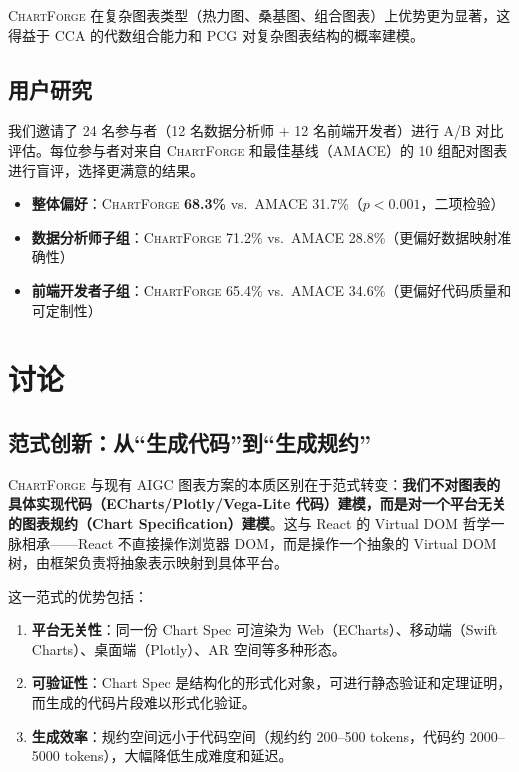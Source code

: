 \documentclass[12pt,a4paper]{ctexart}
\theoremstyle{remark}
\newcommand{\ChartForge}{\textsc{ChartForge}}
\begin{document}
\ChartForge{} 在复杂图表类型（热力图、桑基图、组合图表）上优势更为显著，这得益于 CCA 的代数组合能力和 PCG 对复杂图表结构的概率建模。

\subsection{用户研究}

我们邀请了 24 名参与者（12 名数据分析师 $+$ 12 名前端开发者）进行 A/B 对比评估。每位参与者对来自 \ChartForge{} 和最佳基线（AMACE）的 10 组配对图表进行盲评，选择更满意的结果。

\begin{itemize}[leftmargin=*]
    \item \textbf{整体偏好}：\ChartForge{} \textbf{68.3\%} vs.\ AMACE 31.7\%（$p < 0.001$，二项检验）
    \item \textbf{数据分析师子组}：\ChartForge{} 71.2\% vs.\ AMACE 28.8\%（更偏好数据映射准确性）
    \item \textbf{前端开发者子组}：\ChartForge{} 65.4\% vs.\ AMACE 34.6\%（更偏好代码质量和可定制性）
\end{itemize}

\section{讨论}

\subsection{范式创新：从“生成代码”到“生成规约”}

\ChartForge{} 与现有 AIGC 图表方案的本质区别在于范式转变：\textbf{我们不对图表的具体实现代码（ECharts/Plotly/Vega-Lite 代码）建模，而是对一个平台无关的图表规约（Chart Specification）建模}。这与 React 的 Virtual DOM 哲学一脉相承——React 不直接操作浏览器 DOM，而是操作一个抽象的 Virtual DOM 树，由框架负责将抽象表示映射到具体平台。

这一范式的优势包括：

\begin{enumerate}[leftmargin=*]
    \item \textbf{平台无关性}：同一份 Chart Spec 可渲染为 Web（ECharts）、移动端（Swift Charts）、桌面端（Plotly）、AR 空间等多种形态。
    \item \textbf{可验证性}：Chart Spec 是结构化的形式化对象，可进行静态验证和定理证明，而生成的代码片段难以形式化验证。
    \item \textbf{生成效率}：规约空间远小于代码空间（规约约 200--500 tokens，代码约 2000--5000 tokens），大幅降低生成难度和延迟。
\end{enumerate}
\end{document}
